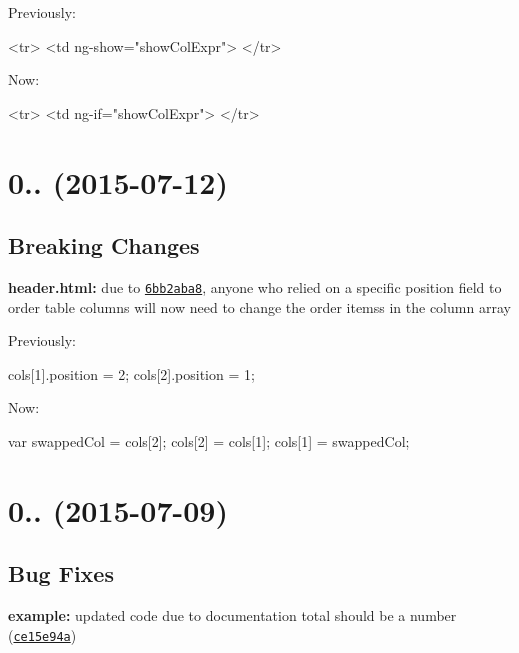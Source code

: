Previously\+:


\begin{DoxyCode}
<tr>
  <td ng-show="showColExpr">
</tr>
\end{DoxyCode}


Now\+:


\begin{DoxyCode}
<tr>
  <td ng-if="showColExpr">
</tr>
\end{DoxyCode}


\label{_0.6.0}%
 \section*{0.. (2015-\/07-\/12)}

\subsection*{Breaking Changes}


\begin{DoxyItemize}
\item {\bfseries header.\+html\+:} due to \href{https://github.com/esvit/ng-table/commit/6bb2aba8ce89a5afdf36f1fe42b7bd71efcf6b81}{\tt 6bb2aba8}, anyone who relied on a specific \textquotesingle{}position\textquotesingle{} field to order table columns will now need to change the order items\textquotesingle{}s in the column array

Previously\+:
\end{DoxyItemize}


\begin{DoxyCode}
cols[1].position = 2;
cols[2].position = 1;
\end{DoxyCode}


Now\+:


\begin{DoxyCode}
var swappedCol = cols[2];
cols[2] = cols[1];
cols[1] = swappedCol;
\end{DoxyCode}


\label{_0.5.5}%
 \section*{0.. (2015-\/07-\/09)}

\subsection*{Bug Fixes}


\begin{DoxyItemize}
\item {\bfseries example\+:} updated code due to documentation total should be a number (\href{https://github.com/esvit/ng-table/commit/ce15e94ae0f71b48078e8ece6e917a7c6d9359da}{\tt ce15e94a})
\end{DoxyItemize}

